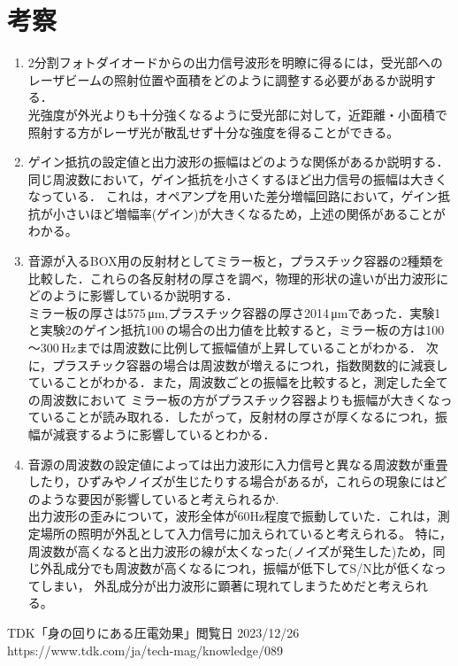 \documentclass{ltjsarticle}
\begin{document}
\section{考察}
	\begin{enumerate}
		\item 2分割フォトダイオードからの出力信号波形を明瞭に得るには，受光部へのレーザビームの照射位置や面積をどのように調整する必要があるか説明する．\\
			光強度が外光よりも十分強くなるように受光部に対して，近距離・小面積で照射する方がレーザ光が散乱せず十分な強度を得ることができる。
		\item ゲイン抵抗の設定値と出力波形の振幅はどのような関係があるか説明する．\\
			同じ周波数において，ゲイン抵抗を小さくするほど出力信号の振幅は大きくなっている．
			これは，オペアンプを用いた差分増幅回路において，ゲイン抵抗が小さいほど増幅率(ゲイン)が大きくなるため，上述の関係があることがわかる。
		\item 音源が入るBOX用の反射材としてミラー板と，プラスチック容器の2種類を比較した．これらの各反射材の厚さを調べ，物理的形状の違いが出力波形にどのように影響しているか説明する．\\
			ミラー板の厚さは575\,μm,プラスチック容器の厚さ2014\,μmであった．実験1と実験2のゲイン抵抗100\,\Omega の場合の出力値を比較すると，ミラー板の方は100～300\,Hzまでは周波数に比例して振幅値が上昇していることがわかる．
			次に，プラスチック容器の場合は周波数が増えるにつれ，指数関数的に減衰していることがわかる．また，周波数ごとの振幅を比較すると，測定した全ての周波数において
			ミラー板の方がプラスチック容器よりも振幅が大きくなっていることが読み取れる．したがって，反射材の厚さが厚くなるにつれ，振幅が減衰するように影響しているとわかる．
		\item 音源の周波数の設定値によっては出力波形に入力信号と異なる周波数が重畳したり，ひずみやノイズが生じたりする場合があるが，これらの現象にはどのような要因が影響していると考えられるか.\\
			出力波形の歪みについて，波形全体が60Hz程度で振動していた．これは，測定場所の照明が外乱として入力信号に加えられていると考えられる。
			特に，周波数が高くなると出力波形の線が太くなった(ノイズが発生した)ため，同じ外乱成分でも周波数が高くなるにつれ，振幅が低下してS/N比が低くなってしまい，
			外乱成分が出力波形に顕著に現れてしまうためだと考えられる。
	\end{enumerate}
\begin{thebibliography}{99}
	TDK「身の回りにある圧電効果」閲覧日 2023/12/26\\
	https://www.tdk.com/ja/tech-mag/knowledge/089
\end{thebibliography}
\end{document}
